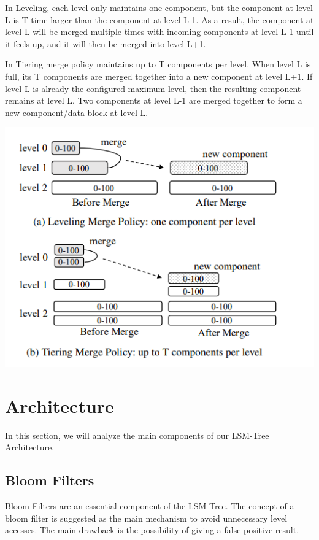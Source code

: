 \documentclass[sigconf]{acmart}
\begin{document}
    In Leveling, each level only maintains one component, but the component at level L is T time larger than the component at level L-1. As a result, the component at level L will be merged multiple times with incoming components at level L-1 until it feels up, and it will then be merged into level L+1.

    In Tiering merge policy maintains up to T components per level. When level L is full, its T components are merged together into a new component at level L+1. If level L is already the configured maximum level, then the resulting component remains at level L. Two components at level L-1 are merged together to form a new component/data block at level L.

    \includegraphics[scale=0.85]{images/MergingStrategies.PNG}

    \section{Architecture}
    In this section, we will analyze the main components of our LSM-Tree Architecture.
    \subsection{Bloom Filters}
    Bloom Filters are an essential component of the LSM-Tree. The concept of a bloom filter is suggested as the main mechanism to avoid unnecessary level accesses. The main drawback is the possibility of giving a false positive result.
\end{document}
